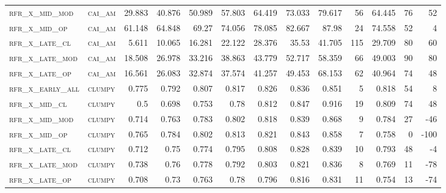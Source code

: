 \begin{landscape}
\begin{center}
\begin{footnotesize}
\begin{longtable}{llrrrrrrrr|rrr}
\textsc{rfr\_x\_mid\_mod  } & \textsc{cai\_am   }   & 29.883  & 40.876  & 50.989  & 57.803   & 64.419   & 73.033   & 79.617   & 56     & 64.445        & 76            & 52              \\
\textsc{rfr\_x\_mid\_op   } & \textsc{cai\_am   }   & 61.148  & 64.848  & 69.27   & 74.056   & 78.085   & 82.667   & 87.98    & 24     & 74.558        & 52            & 4               \\
\textsc{rfr\_x\_late\_cl  } & \textsc{cai\_am   }   & 5.611   & 10.065  & 16.281  & 22.122   & 28.376   & 35.53    & 41.705   & 115    & 29.709        & 80            & 60              \\
\textsc{rfr\_x\_late\_mod } & \textsc{cai\_am   }   & 18.508  & 26.978  & 33.216  & 38.863   & 43.779   & 52.717   & 58.359   & 66     & 49.003        & 90            & 80              \\
\textsc{rfr\_x\_late\_op  } & \textsc{cai\_am   }   & 16.561  & 26.083  & 32.874  & 37.574   & 41.257   & 49.453   & 68.153   & 62     & 40.964        & 74            & 48              \\
\textsc{rfr\_x\_early\_all} & \textsc{clumpy    }   & 0.775   & 0.792   & 0.807   & 0.817    & 0.826    & 0.836    & 0.851    & 5      & 0.818         & 54            & 8               \\
\textsc{rfr\_x\_mid\_cl   } & \textsc{clumpy    }   & 0.5     & 0.698   & 0.753   & 0.78     & 0.812    & 0.847    & 0.916    & 19     & 0.809         & 74            & 48              \\
\textsc{rfr\_x\_mid\_mod  } & \textsc{clumpy    }   & 0.714   & 0.763   & 0.783   & 0.802    & 0.818    & 0.839    & 0.868    & 9      & 0.784         & 27            & -46             \\
\textsc{rfr\_x\_mid\_op   } & \textsc{clumpy    }   & 0.765   & 0.784   & 0.802   & 0.813    & 0.821    & 0.843    & 0.858    & 7      & 0.758         & 0             & -100            \\
\textsc{rfr\_x\_late\_cl  } & \textsc{clumpy    }   & 0.712   & 0.75    & 0.774   & 0.795    & 0.808    & 0.828    & 0.839    & 10     & 0.793         & 48            & -4              \\
\textsc{rfr\_x\_late\_mod } & \textsc{clumpy    }   & 0.738   & 0.76    & 0.778   & 0.792    & 0.803    & 0.821    & 0.836    & 8      & 0.769         & 11            & -78             \\
\textsc{rfr\_x\_late\_op  } & \textsc{clumpy    }   & 0.708   & 0.73    & 0.763   & 0.78     & 0.796    & 0.816    & 0.831    & 11     & 0.754         & 13            & -74             \\

\end{longtable}
\end{footnotesize}
\end{center}
\end{landscape}
